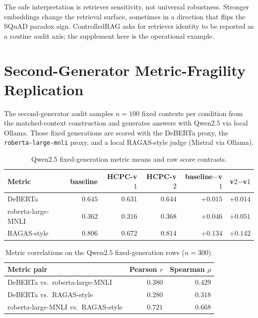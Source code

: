 \documentclass[11pt]{article}
\begin{document}
The safe interpretation is retriever sensitivity, not universal
robustness. Stronger embeddings change the retrieval surface, sometimes
in a direction that flips the SQuAD paradox sign. ControlledRAG asks
for retriever identity to be reported as a routine audit axis;
the supplement here is the operational example.

\section{Second-Generator Metric-Fragility Replication}
\label{supp:qwen}

The second-generator audit samples $n=100$ fixed contexts per condition
from the matched-context construction and generates answers with
Qwen$2.5$ via local Ollama. Those fixed generations are scored with
the DeBERTa proxy, the \texttt{roberta-large-mnli} proxy, and a local
RAGAS-style judge (Mistral via Ollama).

\begin{table}[!htb]
\centering
\caption{Qwen$2.5$ fixed-generation metric means and raw score
contrasts.}
\footnotesize
\begin{tabular}{lrrrrr}
\toprule
Metric & baseline & HCPC-v$1$ & HCPC-v$2$ & baseline$-$v$1$ & v$2$$-$v$1$ \\
\midrule
DeBERTa             & $0.645$ & $0.631$ & $0.644$ & $+0.015$ & $+0.014$ \\
roberta-large-MNLI  & $0.362$ & $0.316$ & $0.368$ & $+0.046$ & $+0.051$ \\
RAGAS-style         & $0.806$ & $0.672$ & $0.814$ & $+0.134$ & $+0.142$ \\
\bottomrule
\end{tabular}
\end{table}

\begin{table}[!htb]
\centering
\caption{Metric correlations on the Qwen$2.5$ fixed-generation rows
($n=300$).}
\footnotesize
\begin{tabular}{lrr}
\toprule
Metric pair & Pearson $r$ & Spearman $\rho$ \\
\midrule
DeBERTa vs.\ roberta-large-MNLI       & $0.380$ & $0.429$ \\
DeBERTa vs.\ RAGAS-style              & $0.280$ & $0.318$ \\
roberta-large-MNLI vs.\ RAGAS-style   & $0.721$ & $0.668$ \\
\bottomrule
\end{tabular}
\end{table}
\end{document}
